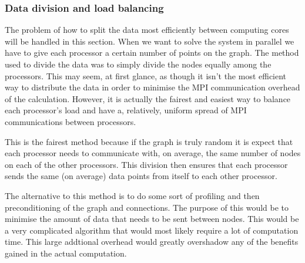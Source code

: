 \documentclass[pdftex,12pt,a4paper]{article}
\begin{document}
\subsubsection{Data division and load balancing}

The problem of how to split the data most efficiently between computing cores will be handled in this section. When we want to solve the system in parallel we have to give each processor a certain number of points on the graph. The method used to divide the data was to simply divide the nodes equally among the processors. This may seem, at first glance, as though it isn't the most efficient way to distribute the data in order to minimise the MPI communication overhead of the calculation. However, it is actually the fairest and easiest way to balance each processor's load and have a, relatively, uniform spread of MPI communications between processors.

This is the fairest method because if the graph is truly random it is expect that each processor needs to communicate with, on average, the same number of nodes on each of the other processors. This division then ensures that each processor sends the same (on average) data points from itself to each other processor.

The alternative to this method is to do some sort of profiling and then preconditioning of the graph and connections. The purpose of this would be to minimise the amount of data that needs to be sent between nodes. This would be a very complicated algorithm that would most likely require a lot of computation time. This large addtional overhead would greatly overshadow any of the benefits gained in the actual computation.
\end{document}
